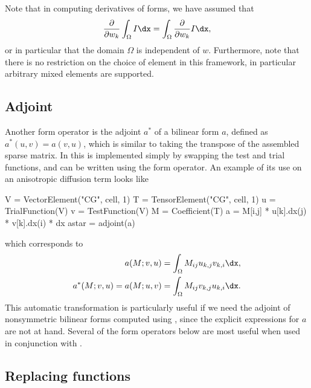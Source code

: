 Note that in computing derivatives of forms, we have assumed that
\begin{align}
\frac{\partial}{\partial w_k} \int_\Omega I \dx
= \int_\Omega \frac{\partial}{\partial w_k} I \dx,
\end{align}
or in particular that the domain $\Omega$ is independent of $w$.
Furthermore, note that there is no restriction on the choice of
element in this framework, in particular arbitrary mixed elements are
supported.

\subsection{Adjoint}
\label{ufl:sec:adjoint}

Another form operator is the adjoint $a^*$ of a bilinear form $a$,
defined as $a^*(u,v) = a(v,u)$, which is similar to taking the
transpose of the assembled sparse matrix.  In \ufl{} this is
implemented simply by swapping the test and trial functions,
and can be written using the  form operator.
An example of its use on an anisotropic diffusion term looks like
\begin{python}
V = VectorElement("CG", cell, 1)
T = TensorElement("CG", cell, 1)
u = TrialFunction(V)
v = TestFunction(V)
M = Coefficient(T)
a = M[i,j] * u[k].dx(j) * v[k].dx(i) * dx
astar = adjoint(a)
\end{python}
which corresponds to
\begin{align}
a(M; v, u) = \int_\Omega M_{ij} u_{k,j} v_{k,i} \dx, \\
a^*(M; v, u) = a(M; u, v) = \int_\Omega  M_{ij} v_{k,j} u_{k,i} \dx.
\end{align}
This automatic transformation is particularly useful if we need the
adjoint of nonsymmetric bilinear forms computed using
, since the explicit expressions for $a$ are not at
hand.  Several of the form operators below are most useful when used
in conjunction with .

\subsection{Replacing functions}
\label{ufl:sec:replace}

